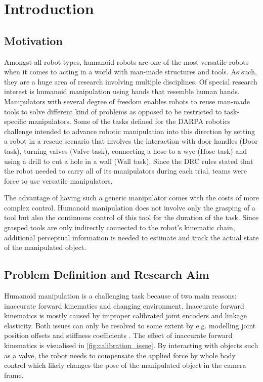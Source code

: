\chapter{Introduction}

\section{Motivation}

Amongst all robot types, humanoid robots are one of the most versatile robots when it comes to acting in a world with man-made structures and tools. As such, they are a huge area of research involving multiple disciplines. Of special research interest is humanoid manipulation using hands that resemble human hands. Manipulators with several degree of freedom enables robots to reuse man-made tools to solve different kind of problems as opposed to be restricted to task-specific manipulators. Some of the tasks defined for the DARPA robotics challenge \cite{DRC2013} intended to advance robotic manipulation into this direction by setting a robot in a rescue scenario that involves the interaction with door handles (Door task), turning valves (Valve task), connecting a hose to a wye (Hose task) and using a drill to cut a hole in a wall (Wall task). Since the DRC rules stated that the robot needed to carry all of its manipulators during each trial, teams were force to use versatile manipulators.

The advantage of having such a generic manipulator comes with the costs of more complex control. Humanoid manipulation does not involve only the grasping of a tool but also the continuous control of this tool for the duration of the task. Since grasped tools are only indirectly connected to the robot's kinematic chain, additional perceptual information is needed to estimate and track the actual state of the manipulated object.


\section{Problem Definition and Research Aim}

Humanoid manipulation is a challenging task because of two main reasons: inaccurate forward kinematics and changing environment.
Inaccurate forward kinematics is mostly caused by improper calibrated joint encoders and linkage elasticity. Both issues can only be resolved to some extent by e.g. modelling joint position offsets \cite{Fallon2015} and stiffness coefficients \cite{Johnson2015}. The effect of inaccurate forward kinematics is visualised in \cref{fig:calibration_issue}.
By interacting with objects such as a valve, the robot needs to compensate the applied force by whole body control which likely changes the pose of the manipulated object in the camera frame.

